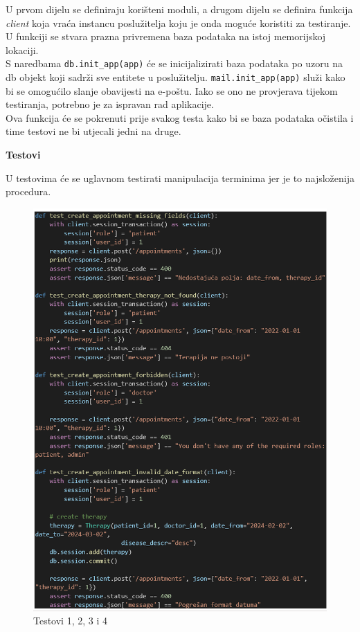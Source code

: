 			U prvom dijelu se definiraju korišteni moduli, a drugom dijelu se definira funkcija \textit{client} koja vraća instancu poslužitelja koju je onda moguće koristiti za testiranje. U funkciji se stvara prazna privremena baza podataka na istoj memorijskoj lokaciji. \\
S naredbama \texttt{db.init\_app(app)} će se inicijalizirati baza podataka po uzoru na db objekt koji sadrži sve entitete u poslužitelju. \texttt{mail.init\_app(app)} služi kako bi se omogućilo slanje obavijesti na e-poštu. Iako se ono ne provjerava tijekom testiranja, potrebno je za ispravan rad aplikacije. \\
Ova funkcija će se pokrenuti prije svakog testa kako bi se baza podataka očistila i time testovi ne bi utjecali jedni na druge.


\textbf{Testovi}


U testovima će se uglavnom testirati manipulacija terminima jer je to najsloženija procedura.

            \begin{figure}[H]
				\includegraphics[scale=0.3]{slike/testovi_1_2_3_4.PNG} %
				\centering
				\caption{Testovi 1, 2, 3 i 4}
				\label{fig:testovi1234}
			\end{figure}
			
